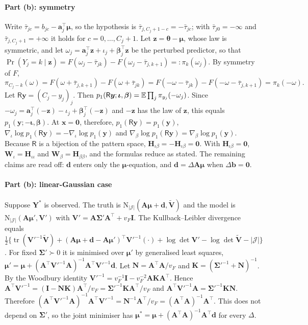 \paragraph{Part (b): symmetry}
Write $\bar\tau_{jc}=b_{jc}-\bm a_j^\top\bm\mu$, so the hypothesis is $\bar\tau_{j,C_j+1-c}=-\bar\tau_{jc}$; with $\bar\tau_{j0}=-\infty$ and $\bar\tau_{j,C_j+1}=+\infty$ it holds for $c=0,\dots,C_j+1$. Let $\bm z=\bm\theta-\bm\mu$, whose law is symmetric, and let $\omega_j=\bm a_j^\top\bm z+\iota_j+\bm\beta_j^\top\bm z$ be the perturbed predictor, so that $\Pr(Y_j=k\mid\bm z)=F(\omega_j-\bar\tau_{jk})-F(\omega_j-\bar\tau_{j,k+1})=:\pi_k(\omega_j)$. By symmetry of $F$,
\[
  \pi_{C_j-k}(\omega)=F(\omega+\bar\tau_{j,k+1})-F(\omega+\bar\tau_{jk})=F(-\omega-\bar\tau_{jk})-F(-\omega-\bar\tau_{j,k+1})=\pi_k(-\omega).
\]
Let $\mathsf R\bm y=(C_j-y_j)_j$. Then $p_1(\mathsf R\bm y;\bm\iota,\bm\beta)=\mathbb{E}\prod_j\pi_{y_j}(-\omega_j)$. Since $-\omega_j=\bm a_j^\top(-\bm z)-\iota_j+\bm\beta_j^\top(-\bm z)$ and $-\bm z$ has the law of $\bm z$, this equals $p_1(\bm y;-\bm\iota,\bm\beta)$. At $\bm x=\bm0$, therefore, $p_1(\mathsf R\bm y)=p_1(\bm y)$, $\nabla_\iota\log p_1(\mathsf R\bm y)=-\nabla_\iota\log p_1(\bm y)$ and $\nabla_\beta\log p_1(\mathsf R\bm y)=\nabla_\beta\log p_1(\bm y)$. Because $\mathsf R$ is a bijection of the pattern space, $\bm H_{\iota\beta}=-\bm H_{\iota\beta}=\bm0$. With $\bm H_{\iota\beta}=\bm0$, $\bm W_\iota=\bm H_{\iota\iota}$ and $\bm W_\beta=\bm H_{\beta\beta}$, and the formulas reduce as stated. The remaining claims are read off: $\bm d$ enters only the $\bm\mu$-equation, and $\bm d=\Delta\bm A\bm\mu$ when $\Delta\bm b=\bm0$.

\paragraph{Part (b): linear-Gaussian case}
Suppose $\bm Y^*$ is observed. The truth is $\mathrm N_{|\mathcal J|}(\bm A\bm\mu+\bm d,\tilde{\bm V})$ and the model is $\mathrm N_{|\mathcal J|}(\bm A\bm\mu',\bm V')$ with $\bm V'=\bm A\bm\Sigma'\bm A^\top+v_F\bm I$. The Kullback--Leibler divergence equals $\tfrac12\{\operatorname{tr}(\bm V'^{-1}\tilde{\bm V})+(\bm A\bm\mu+\bm d-\bm A\bm\mu')^\top\bm V'^{-1}(\cdot)+\log\det\bm V'-\log\det\tilde{\bm V}-|\mathcal J|\}$. For fixed $\bm\Sigma'\succ0$ it is minimised over $\bm\mu'$ by generalised least squares, $\bm\mu'=\bm\mu+(\bm A^\top\bm V'^{-1}\bm A)^{-1}\bm A^\top\bm V'^{-1}\bm d$. Let $\bm N=\bm A^\top\bm A/v_F$ and $\bm K=(\bm\Sigma'^{-1}+\bm N)^{-1}$. By the Woodbury identity $\bm V'^{-1}=v_F^{-1}\bm I-v_F^{-2}\bm A\bm K\bm A^\top$. Hence $\bm A^\top\bm V'^{-1}=(\bm I-\bm N\bm K)\bm A^\top/v_F=\bm\Sigma'^{-1}\bm K\bm A^\top/v_F$ and $\bm A^\top\bm V'^{-1}\bm A=\bm\Sigma'^{-1}\bm K\bm N$. Therefore $(\bm A^\top\bm V'^{-1}\bm A)^{-1}\bm A^\top\bm V'^{-1}=\bm N^{-1}\bm A^\top/v_F=(\bm A^\top\bm A)^{-1}\bm A^\top$. This does not depend on $\bm\Sigma'$, so the joint minimiser has $\bm\mu^*=\bm\mu+(\bm A^\top\bm A)^{-1}\bm A^\top\bm d$ for every $\Delta$.

